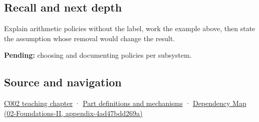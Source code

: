 \subsection{Recall and next depth}\label{appendix-2ed044358b82-recall-and-next-depth}

Explain arithmetic policies without the label, work the example above, then state the assumption whose removal would change the result.

\textbf{Pending:} choosing and documenting policies per subsystem.

\subsection{Source and navigation}\label{appendix-2ed044358b82-source-and-navigation}

\hyperref[01-foundations-i-ch001-arithmetic-becomes-a-policy]{C002 teaching chapter} · \hyperref[appendix-fd090d982a15]{Part definitions and mechanisms} · \href{../02-Foundations-II/main.pdf\#nameddest=appendix-4ad47bdd269a}{Dependency Map (02-Foundations-II, appendix-4ad47bdd269a)}

